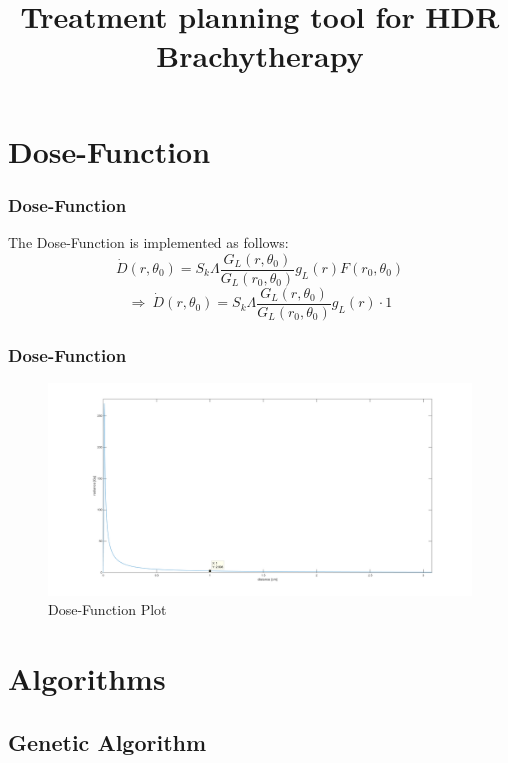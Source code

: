 \documentclass{beamer}
\author[Elm S. \& Karthe T. \& Golebiewski D. \& Schröder M.E.]
{%
   \texorpdfstring{
        \begin{columns}
            \column{.45\linewidth}
            \centering
            \RBox{Elm S.\\
            \href{mailto:sebastian.elm@tuhh.de}{sebastian.elm@tuhh.de}}
            \column{.45\linewidth}
            \centering
            \RBox{Karthe T.\\
            \href{mailto:thobias.karthe@tuhh.de}{thobias.karthe@tuhh.de}}
        \end{columns}
        \vspace{0.5cm}
        \begin{columns}
            \column{.45\linewidth}
            \centering
            \RBox{Golebiewski D.\\
            \href{mailto:subhamsoni0049@pec.edu}{subhamsoni0049@pec.edu}}
            \column{.45\linewidth}
            \centering
            \RBox{Schröder M.E.\\
            \href{mailto:malte.schroeder@tuhh.de}{malte.schroeder@tuhh.de}}
        \end{columns}
        \vspace{-0.3cm}
        \begin{columns}
          \column{0.3\linewidth}
          \raggedleft
            \vspace{-4.8cm}
            \column{0.6\linewidth}
            \raggedright
            Institute of Medical Technology\\[1.1ex]
            TUHH
            \vspace{-4.8cm}
        \end{columns}
   }
   {John Doe \& Jane Doe}
}
\title{Treatment planning tool for HDR Brachytherapy}
\begin{document}
\begin{frame}
\titlepage
\end{frame}
\frame{\tableofcontents}

\section{Dose-Function}

\frame{\tableofcontents[currentsection]}

\begin{frame}
\frametitle{Dose-Function}
The Dose-Function is implemented as follows:
\begin{equation}
\dot{D}(r,\theta_{0})= S_{k}\Lambda \frac{G_{L}(r,\theta_{0})}{G_{L}(r_{0},\theta_{0})} g_{L}(r) F(r_{0},\theta_{0})
\end{equation}
\begin{equation}
\Rightarrow \ \dot{D}(r,\theta_{0})= S_{k}\Lambda \frac{G_{L}(r,\theta_{0})}{G_{L}(r_{0},\theta_{0})} g_{L}(r) \cdot 1
\end{equation}
\end{frame}


\begin{frame}
\frametitle{Dose-Function}
	\begin{figure}[h]
	\centering
	\includegraphics[width=1\textwidth]{pictures/dosefunction}
	\caption{Dose-Function Plot}
	\end{figure}
 
 
\end{frame}


\section{Algorithms}
\frame{\tableofcontents[currentsection]}
\subsection{Genetic Algorithm}
\frame{\tableofcontents[currentsubsection]}
\end{document}
